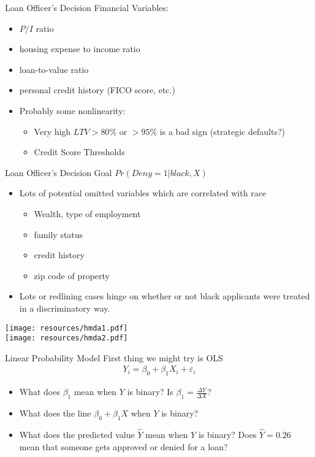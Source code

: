 \documentclass[aspectratio=169]{beamer}
\begin{document}
\begin{frame}{Loan Officer's Decision}
Financial Variables:
\begin{itemize}
\item $P/I$ ratio
\item housing expense to income ratio
\item loan-to-value ratio
\item personal credit history (FICO score, etc.)
\item Probably some nonlinearity:
\begin{itemize}
\item Very high $LTV > 80\%$ or $>95\%$ is a bad sign (strategic defaults?)
\item Credit Score Thresholds
\end{itemize}
\end{itemize}
\end{frame}


\begin{frame}{Loan Officer's Decision}
Goal $Pr(Deny=1 | black, X)$\\

\begin{itemize}
\item Lots of potential \alert{omitted variables} which are correlated with race
\begin{itemize}
\item Wealth, type of employment
\item family status
\item credit history
\item zip code of property
\end{itemize}
\item Lots or \alert{redlining} cases hinge on whether or not black applicants were treated in a discriminatory way.
\end{itemize}
\end{frame}

\begin{frame}
\begin{center}
\texttt{[image: resources/hmda1.pdf]}\\
\texttt{[image: resources/hmda2.pdf]}
\end{center}
\end{frame}


\begin{frame}{Linear Probability Model}
First thing we might try is OLS
\begin{eqnarray*}
Y_i  = \beta_0 + \beta_1 X_i + \varepsilon_i
\end{eqnarray*}
\begin{itemize}
\item What does $\beta_1$ mean when $Y$ is binary? Is $\beta_1  = \frac{\Delta Y}{\Delta X}$?
\item What does the line $\beta_0 + \beta_1 X$ when $Y$ is binary?
\item What does the predicted value $\hat{Y}$ mean when $Y$ is binary? Does $\hat{Y} = 0.26$ mean that someone gets approved or denied for a loan?
\end{itemize}
\end{frame}
\end{document}
